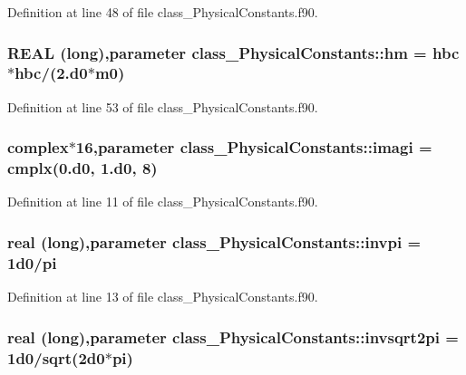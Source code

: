 Definition at line 48 of file class\_\-PhysicalConstants.f90.

\hypertarget{namespaceclass__PhysicalConstants_a5d8b8543af92098fe08729607d72a22a}{
\subsubsection[{hm}]{\setlength{\rightskip}{0pt plus 5cm}REAL (long),parameter {\bf class\_\-PhysicalConstants::hm} = {\bf hbc}$\ast${\bf hbc}/(2.d0$\ast${\bf m0})}}
\label{namespaceclass__PhysicalConstants_a5d8b8543af92098fe08729607d72a22a}


Definition at line 53 of file class\_\-PhysicalConstants.f90.

\hypertarget{namespaceclass__PhysicalConstants_ac45be97becb491b16f05e8f0695d03ba}{
\subsubsection[{imagi}]{\setlength{\rightskip}{0pt plus 5cm}complex$\ast$16,parameter {\bf class\_\-PhysicalConstants::imagi} = cmplx(0.d0, 1.d0, 8)}}
\label{namespaceclass__PhysicalConstants_ac45be97becb491b16f05e8f0695d03ba}


Definition at line 11 of file class\_\-PhysicalConstants.f90.

\hypertarget{namespaceclass__PhysicalConstants_a3c84b6c8e14a53682461f34fd08584bb}{
\subsubsection[{invpi}]{\setlength{\rightskip}{0pt plus 5cm}real (long),parameter {\bf class\_\-PhysicalConstants::invpi} = 1d0/pi}}
\label{namespaceclass__PhysicalConstants_a3c84b6c8e14a53682461f34fd08584bb}


Definition at line 13 of file class\_\-PhysicalConstants.f90.

\hypertarget{namespaceclass__PhysicalConstants_a7dee25e7580520ed07ea8ea46cd96706}{
\subsubsection[{invsqrt2pi}]{\setlength{\rightskip}{0pt plus 5cm}real (long),parameter {\bf class\_\-PhysicalConstants::invsqrt2pi} = 1d0/sqrt(2d0$\ast$pi)}}
\label{namespaceclass__PhysicalConstants_a7dee25e7580520ed07ea8ea46cd96706}


